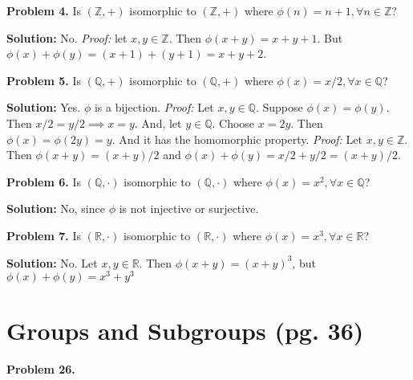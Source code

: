 \documentclass[12pt, letterpaper]{article}
\newenvironment{problem}
    [1]
    {\noindent \textbf{Problem #1.}}
    {\vspace{3mm}}
\newenvironment{solution}
    [0]
    {\noindent \textbf{Solution:}} 
    {\vspace{3mm}}
\begin{document}
    \begin{problem}{4}
        Is $(\mathbb{Z}, +)$ isomorphic to $(\mathbb{Z}, +)$ where $\phi(n)=n + 1, \forall n \in \mathbb{Z}$?
    \end{problem}

    \begin{solution}
        No. \emph{Proof:} let $x, y \in \mathbb{Z}$. Then $\phi(x + y)= x + y + 1$. But $\phi(x)+\phi(y)=
        (x + 1) + (y + 1) = x + y + 2$.
    \end{solution}

    \begin{problem}{5}
        Is $(\mathbb{Q}, +)$ isomorphic to $(\mathbb{Q}, +)$ where $\phi(x)=x/2, \forall x \in \mathbb{Q}$?
    \end{problem}

    \begin{solution}
        Yes. $\phi$ is a bijection. \emph{Proof:} Let $x, y \in \mathbb{Q}$. Suppose $\phi(x) = \phi(y)$.
        Then $x/2 = y/2 \implies x = y$. And, let $y \in \mathbb{Q}$. Choose $x = 2y$. Then $\phi(x) = 
        \phi(2y) = y$. And it has the homomorphic property. \emph{Proof:} Let $x, y \in \mathbb{Z}$. 
        Then $\phi(x + y)=(x+y)/2$ and $\phi(x)+\phi(y)=x/2+y/2=(x+y)/2$.
    \end{solution}

    \begin{problem}{6}
        Is $(\mathbb{Q}, \cdot)$ isomorphic to $(\mathbb{Q}, \cdot)$ where $\phi(x)=x^2, \forall x \in \mathbb{Q}$?
    \end{problem}

    \begin{solution}
        No, since $\phi$ is not injective or surjective.
    \end{solution}

    \begin{problem}{7}
        Is $(\mathbb{R}, \cdot)$ isomorphic to $(\mathbb{R}, \cdot)$ where $\phi(x)=x^3, \forall x \in \mathbb{R}$?
    \end{problem}

    \begin{solution}
        No. Let $x, y \in \mathbb{R}$. Then $\phi(x + y) = (x+y)^3$, but $\phi(x)+\phi(y)=x^3+y^3$
    \end{solution}
\section{Groups and Subgroups (pg. 36)} 
    \begin{problem}{26}
    \end{problem}
\end{document}

